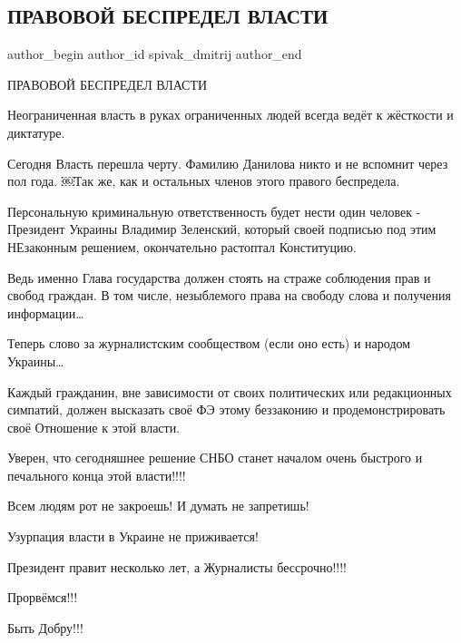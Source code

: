  
 
 
 
 
 
\subsection{ПРАВОВОЙ БЕСПРЕДЕЛ ВЛАСТИ}
\label{sec:11_02_2022.fb.spivak_dmitrij.1.pravovoj_bespredel_vlasti}
 
\ifcmt
 author_begin
   author_id spivak_dmitrij
 author_end
\fi

ПРАВОВОЙ БЕСПРЕДЕЛ ВЛАСТИ

Неограниченная власть в руках ограниченных людей всегда ведёт к жёсткости и
диктатуре. 

Сегодня Власть перешла черту.  Фамилию Данилова никто и не вспомнит через пол
года. ￼Так же, как и остальных членов этого правого беспредела. 

Персональную криминальную ответственность будет нести один человек - Президент
Украины Владимир Зеленский, который своей подписью под этим НЕзаконным
решением, окончательно растоптал Конституцию. 

Ведь именно Глава государства должен стоять на страже соблюдения прав и свобод
граждан. В том числе, незыблемого  права на свободу слова и получения
информации…

Теперь слово за журналистским сообществом (если оно есть) и народом Украины…  

Каждый гражданин, вне зависимости от своих политических или редакционных
симпатий, должен высказать своё ФЭ этому беззаконию и продемонстрировать своё
Отношение к этой власти.  

Уверен, что сегодняшнее решение СНБО станет началом очень быстрого и печального
конца этой власти!!!! 

Всем людям рот не закроешь! И думать не запретишь! 

Узурпация власти в Украине не приживается! 

Президент правит несколько лет, а Журналисты бессрочно!!!!

Прорвёмся!!!

Быть Добру!!!

